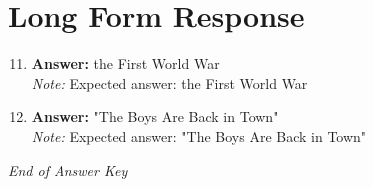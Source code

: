 \documentclass[12pt]{article}
\begin{document}
\section*{Long Form Response}
\begin{enumerate}[label=\arabic*.]
\setcounter{enumi}{10}
\item \textbf{Answer:} the First World War
\\ \textit{Note:} Expected answer: the First World War
\item \textbf{Answer:} "The Boys Are Back in Town"
\\ \textit{Note:} Expected answer: "The Boys Are Back in Town"
\end{enumerate}

\vfill
\noindent\textit{End of Answer Key}
\end{document}
